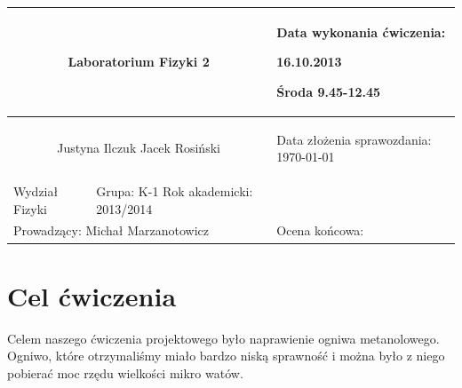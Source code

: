 \documentclass[a4paper,12pt]{article}
\author{Justyna Ilczuk, Jacek Rosiński}
\begin{document}
\begin{center}

    \begin{tabular}{ | m{5cm}| m{5cm} | m{5cm} |}
    \hline 
    \multicolumn{2}{|c|}{{ \Large \textbf{Laboratorium Fizyki 2}} }
    &  
    \begin{center}
    Data wykonania ćwiczenia:
    \end{center}
    \begin{center}
      16.10.2013 
    \end{center}
    \begin{center}
    Środa 9.45-12.45
    \end{center}
     \\ 
    
    \hline
    \multicolumn{2}{|c|}{Justyna Ilczuk \newline Jacek Rosiński}
    & \begin{center}
    {\small Data złożenia sprawozdania:} \newline \today
    \end{center}   \\
   	
   	\hline
    Wydział Fizyki & Grupa: K-1 \newline Rok akademicki: 2013/2014 &  \\
   	\hline
   	\multicolumn{2}{|l|}{Prowadzący: Michał Marzanotowicz} & \multicolumn{1}{|l|}{Ocena końcowa:}\\
    \hline
    \end{tabular}
\end{center}

\newpage

\pagestyle{fancy}
\fancyfoot[CO]{\ }
\fancyhead[RO]{\footnotesize{\thepage} }




\section{Cel ćwiczenia}

Celem naszego ćwiczenia projektowego było naprawienie ogniwa metanolowego. Ogniwo, które otrzymaliśmy miało bardzo niską sprawność i można było z niego pobierać moc rzędu wielkości mikro watów.
\end{document}

